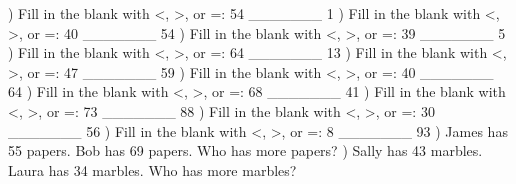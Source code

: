 \documentclass{article}%
\begin{document}
\newline%
\newline%
) Fill in the blank with <, >, or =: 54 \_\_\_\_\_\_\_ 1%
\newline%
\newline%
) Fill in the blank with <, >, or =: 40 \_\_\_\_\_\_\_ 54%
\newline%
\newline%
) Fill in the blank with <, >, or =: 39 \_\_\_\_\_\_\_ 5%
\newline%
\newline%
) Fill in the blank with <, >, or =: 64 \_\_\_\_\_\_\_ 13%
\newline%
\newline%
) Fill in the blank with <, >, or =: 47 \_\_\_\_\_\_\_ 59%
\newline%
\newline%
) Fill in the blank with <, >, or =: 40 \_\_\_\_\_\_\_ 64%
\newline%
\newline%
) Fill in the blank with <, >, or =: 68 \_\_\_\_\_\_\_ 41%
\newline%
\newline%
) Fill in the blank with <, >, or =: 73 \_\_\_\_\_\_\_ 88%
\newline%
\newline%
) Fill in the blank with <, >, or =: 30 \_\_\_\_\_\_\_ 56%
\newline%
\newline%
) Fill in the blank with <, >, or =: 8 \_\_\_\_\_\_\_ 93%
\newline%
\newline%
) James has 55 papers. Bob has 69 papers. Who has more papers?%
\newline%
\newline%
) Sally has 43 marbles. Laura has 34 marbles. Who has more marbles?%
\newline%
\newline%
\end{document}
